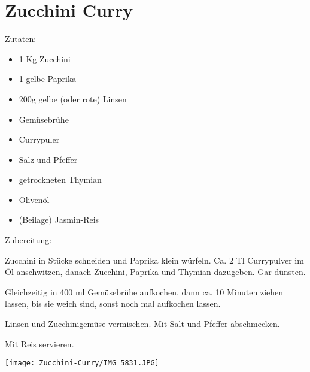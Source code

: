 \section{Zucchini Curry}
Zutaten:
\begin{itemize}
    \item 1 Kg Zucchini
    \item 1 gelbe Paprika
    \item 200g gelbe (oder rote) Linsen
    \item Gemüsebrühe
    \item Currypuler
    \item Salz und Pfeffer
    \item getrockneten Thymian
    \item Olivenöl
    \item (Beilage) Jasmin-Reis
\end{itemize}

\noindent Zubereitung:

\noindent Zucchini in Stücke schneiden und Paprika klein würfeln. Ca. 2 Tl Currypulver im Öl anschwitzen, danach Zucchini, Paprika und Thymian dazugeben. Gar dünsten.

Gleichzeitig in 400 ml Gemüsebrühe aufkochen, dann ca. 10 Minuten ziehen lassen, bis sie weich sind, sonst noch mal aufkochen lassen.

Linsen und Zucchinigemüse vermischen. Mit Salt und Pfeffer abschmecken.

Mit Reis servieren.
\newpage
\mbox{}
\vfill
\begin{center}
    \texttt{[image: Zucchini-Curry/IMG\_5831.JPG]}
\end{center}
\vfill
\mbox{ }
\newpage
